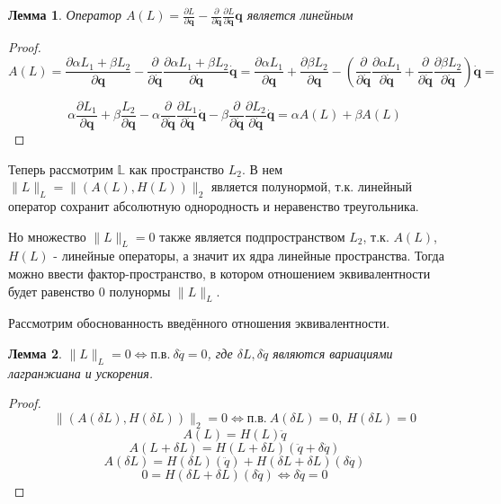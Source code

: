 \documentclass[12pt, twoside]{article}
\newtheorem{lemma}{Лемма}
\begin{document}
\begin{lemma} \label{lemma2}
Оператор $A (L) = \frac{\partial L}{\partial \mathbf{q}}-\frac{\partial}{\partial \dot{\mathbf{q}}} \frac{\partial L}{\partial \dot{\mathbf{q}}} \mathbf{q}$ является линейным
\end{lemma}
\begin{proof}
$$A (L) = \frac{\partial \alpha L_1 + \beta L_2}{\partial \mathbf{q}}-\frac{\partial}{\partial \dot{\mathbf{q}}} \frac{\partial \alpha L_1 + \beta L_2}{\partial \dot{\mathbf{q}}} \dot{\mathbf{q}} = 
\frac{\partial \alpha L_1}{\partial \mathbf{q}} + \frac{\partial\beta L_2}{\partial \mathbf{q}} - \left(\frac{\partial}{\partial \dot{\mathbf{q}}} \frac{\partial \alpha L_1}{\partial \dot{\mathbf{q}}} + \frac{\partial}{\partial \dot{\mathbf{q}}} \frac{\partial \beta L_2}{\partial \dot{\mathbf{q}}}\right) \dot{\mathbf{q}} = $$

$$\alpha\frac{\partial  L_1 }{\partial \mathbf{q}} + \beta\frac{L_2}{\partial \mathbf{q}} -  \alpha\frac{\partial}{\partial \dot{\mathbf{q}}} \frac{\partial L_1}{\partial \dot{\mathbf{q}}}\dot{\mathbf{q}} -  \beta\frac{\partial}{\partial \dot{\mathbf{q}}} \frac{\partial L_2}{\partial \dot{\mathbf{q}}} \dot{\mathbf{q}} = \alpha A(L) + \beta A(L)
$$
\end{proof}

Теперь рассмотрим $\mathbb{L}$ как пространство $L_2$. В нем $\|L\|_L = \|(A(L), H(L))\|_2$ является полунормой, т.к. линейный оператор сохранит абсолютную однородность и неравенство треугольника.

Но множество $\|L\|_L = 0$ также является подпространством $L_2$, т.к. $A(L)$, $H(L)$  - линейные операторы, а значит их ядра линейные пространства. Тогда можно ввести фактор-пространство, в котором отношением эквивалентности будет равенство 0 полунормы $\|L\|_L$.

Рассмотрим обоснованность введённого отношения эквивалентности.
\begin{lemma} \label{lemmaeq}
$\|L\|_L = 0 \Leftrightarrow \text{п.в.}\ \delta \ddot{q} = 0$, где $\delta L, \delta \ddot{q}$ являются вариациями лагранжиана и ускорения.
\end{lemma}
\begin{proof}
$$ \|(A(\delta L), H(\delta L))\|_2 = 0 \Leftrightarrow \text{п.в.}\ A(\delta L) = 0, \ H(\delta L) = 0$$
$$A(L) = H(L)\ddot{q}$$
$$A(L+\delta L) = H(L+\delta L)(\ddot{q} + \delta \ddot{q})$$
$$ A(\delta L) = H(\delta L)(\ddot{q}) + H(\delta L+\delta L)(\delta \ddot{q})$$
$$ 0 = H(\delta L+\delta L)(\delta \ddot{q}) \Leftrightarrow \delta \ddot{q} = 0$$


\end{proof}
\end{document}
